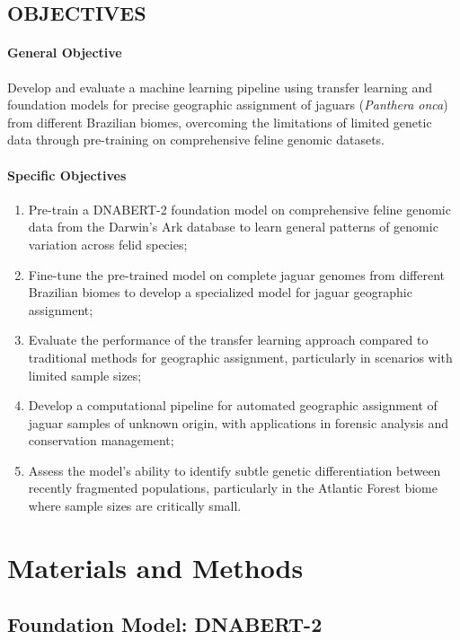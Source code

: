 \documentclass[twocolumn,10pt]{article}
\begin{document}
\subsection*{OBJECTIVES}

\paragraph{General Objective}

Develop and evaluate a machine learning pipeline using transfer learning and foundation models for
precise geographic assignment of jaguars (\textit{Panthera onca}) from different Brazilian biomes,
overcoming the limitations of limited genetic data through pre-training on comprehensive feline
genomic datasets.

\paragraph{Specific Objectives}

\begin{enumerate}
        \item Pre-train a DNABERT-2 foundation model on comprehensive feline genomic data from the
Darwin's Ark database to learn general patterns of genomic variation across felid species;
        \item Fine-tune the pre-trained model on complete jaguar genomes from different Brazilian
biomes to develop a specialized model for jaguar geographic assignment;
        \item Evaluate the performance of the transfer learning approach compared to traditional
methods for geographic assignment, particularly in scenarios with limited sample sizes;
        \item Develop a computational pipeline for automated geographic assignment of jaguar samples
of unknown origin, with applications in forensic analysis and conservation management;
        \item Assess the model's ability to identify subtle genetic differentiation between recently
fragmented populations, particularly in the Atlantic Forest biome where sample sizes are critically
small.
\end{enumerate}

\section{Materials and Methods}

\subsection{Foundation Model: DNABERT-2}
\end{document}

